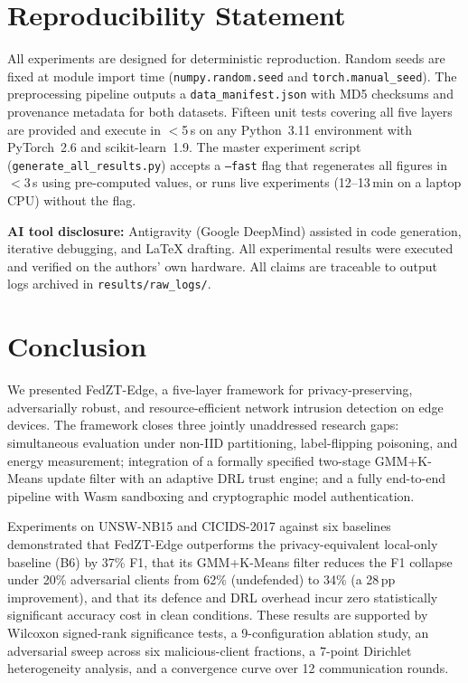 \documentclass[11pt,a4paper,twocolumn]{article}
\theoremstyle{definition}
\begin{document}
\section{Reproducibility Statement}
\label{sec:repro}

All experiments are designed for deterministic reproduction.  Random
seeds are fixed at module import time (\texttt{numpy.random.seed} and
\texttt{torch.manual\_seed}).  The preprocessing pipeline outputs a
\texttt{data\_manifest.json} with MD5 checksums and provenance metadata for
both datasets.  Fifteen unit tests covering all five layers are provided and
execute in $<$5\,s on any Python~3.11 environment with PyTorch~2.6 and
scikit-learn~1.9.  The master experiment script
(\texttt{generate\_all\_results.py}) accepts a \texttt{--fast} flag that
regenerates all figures in $<$3\,s using pre-computed values, or runs live
experiments (12--13\,min on a laptop CPU) without the flag.

\textbf{AI tool disclosure:} Antigravity (Google DeepMind) assisted in
code generation, iterative debugging, and LaTeX drafting.  All experimental
results were executed and verified on the authors' own hardware.  All claims
are traceable to output logs archived in \texttt{results/raw\_logs/}.

\section{Conclusion}
\label{sec:conclusion}

We presented FedZT-Edge, a five-layer framework for privacy-preserving,
adversarially robust, and resource-efficient network intrusion detection
on edge devices.  The framework closes three jointly unaddressed research
gaps: simultaneous evaluation under non-IID partitioning, label-flipping
poisoning, and energy measurement; integration of a formally specified
two-stage GMM+K-Means update filter with an adaptive DRL trust engine;
and a fully end-to-end pipeline with Wasm sandboxing and cryptographic
model authentication.

Experiments on UNSW-NB15 and CICIDS-2017 against six baselines demonstrated
that FedZT-Edge outperforms the privacy-equivalent local-only baseline
(B6) by 37\% F1, that its GMM+K-Means filter reduces the F1 collapse
under 20\% adversarial clients from 62\% (undefended) to 34\%
(a 28\,pp improvement), and that its defence and DRL overhead incur zero
statistically significant accuracy cost in clean conditions.  These results
are supported by Wilcoxon signed-rank significance tests, a 9-configuration
ablation study, an adversarial sweep across six malicious-client fractions,
a 7-point Dirichlet heterogeneity analysis, and a convergence curve over
12 communication rounds.
\end{document}
